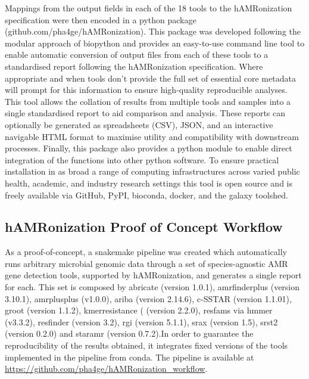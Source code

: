 Mappings from the output fields in each of the 18 tools to the hAMRonization specification were then encoded in a python package (github.com/pha4ge/hAMRonization). This package was developed following the modular approach of biopython \cite{cock_biopython_2009} and provides an easy-to-use command line tool to enable automatic conversion of output files from each of these tools to a standardised report following the hAMRonization specification. Where appropriate and when tools don’t provide the full set of essential core metadata will prompt for this information to ensure high-quality reproducible analyses.  This tool allows the collation of results from multiple tools and samples into a single standardised report to aid comparison and analysis.  These reports can optionally be generated as spreadsheets (CSV), JSON, and an interactive navigable HTML format to maximise utility and compatibility with downstream processes. Finally, this package also provides a python module to enable direct integration of the functions into other python software. To ensure practical installation in as broad a range of computing infrastructures across varied public health, academic, and industry research settings this tool is open source and is freely available via GitHub, PyPI, bioconda, docker, and the galaxy toolshed.  

\subsection{hAMRonization Proof of Concept Workflow}

As a proof-of-concept, a  snakemake pipeline \cite{koster_snakemake--scalable_2012} was created which automatically runs arbitrary microbial genomic data through a set of species-agnostic AMR gene detection tools, supported by hAMRonization, and generates a single report for each. This set is composed by abricate (version 1.0.1), amrfinderplus \cite{feldgarden_validating_2019} (version 3.10.1), amrplusplus \cite{doster_megares_2020} (v1.0.0), ariba \cite{hunt_ariba_2017}(version 2.14.6), c-SSTAR \cite{de_man_sstar_2016} (version 1.1.01), groot \cite{rowe_indexed_2018} (version 1.1.2), kmerresistance \cite{clausen_benchmarking_2016}( (version 2.2.0), resfams \cite{gibson_improved_2015} via hmmer (v3.3.2), resfinder \cite{bortolaia_resfinder_2020} (version 3.2), rgi \cite{alcock_card_2020} (version 5.1.1), srax \cite{panunzi_srax_2020} (version 1.5), srst2 \cite{inouye_srst2_2014} (version 0.2.0) and staramr \cite{zankari_identification_2012} (version 0.7.2).In order to guarantee the reproducibility of the results obtained, it integrates fixed versions of the tools implemented in the pipeline from conda. The pipeline is available at  \url{https://github.com/pha4ge/hAMRonization_workflow}. 


